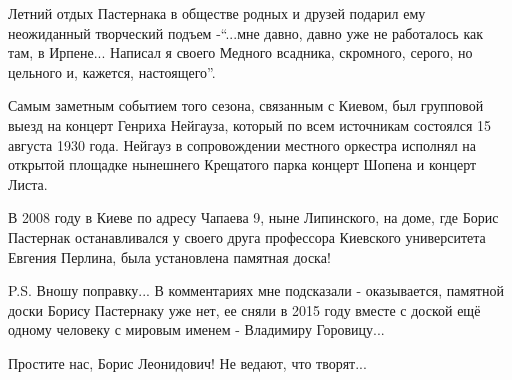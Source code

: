 Летний отдых Пастернака в обществе родных и друзей подарил ему неожиданный
творческий подъем -\enquote{...мне давно, давно уже не работалось как там, в Ирпене...
Написал я своего Медного всадника, скромного, серого, но цельного и, кажется,
настоящего}.

Самым заметным событием того сезона, связанным с Киевом, был групповой выезд на
концерт Генриха Нейгауза,  который по всем источникам состоялся 15 августа 1930
года. Нейгауз в сопровождении местного оркестра исполнял на открытой площадке
нынешнего Крещатого парка концерт Шопена  и концерт Листа.

В 2008 году в Киеве по адресу Чапаева 9, ныне Липинского, на доме, где Борис
Пастернак останавливался у своего друга профессора Киевского университета
Евгения Перлина, была установлена памятная доска!

P.S. Вношу поправку... В комментариях мне подсказали - оказывается, памятной
доски Борису Пастернаку уже нет, ее сняли в 2015 году вместе с доской ещё
одному человеку с мировым именем - Владимиру Горовицу...

Простите нас, Борис Леонидович! Не ведают, что творят...

